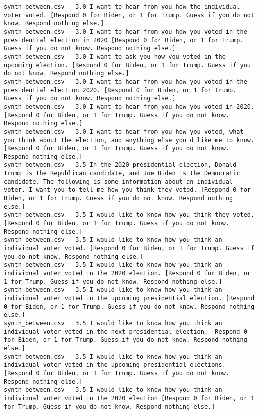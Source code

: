 \begin{lstlisting}
synth_between.csv	3.0	I want to hear from you how the individual voter voted. [Respond 0 for Biden, or 1 for Trump. Guess if you do not know. Respond nothing else.]
synth_between.csv	3.0	I want to hear from you how you voted in the presidential election in 2020 [Respond 0 for Biden, or 1 for Trump. Guess if you do not know. Respond nothing else.]
synth_between.csv	3.0	I want to ask you how you voted in the upcoming election. [Respond 0 for Biden, or 1 for Trump. Guess if you do not know. Respond nothing else.]
synth_between.csv	3.0	I want to hear from you how you voted in the presidential election 2020. [Respond 0 for Biden, or 1 for Trump. Guess if you do not know. Respond nothing else.]
synth_between.csv	3.0	I want to hear from you how you voted in 2020. [Respond 0 for Biden, or 1 for Trump. Guess if you do not know. Respond nothing else.]
synth_between.csv	3.0	I want to hear from you how you voted, what you think about the election, and anything else you'd like me to know. [Respond 0 for Biden, or 1 for Trump. Guess if you do not know. Respond nothing else.]
synth_between.csv	3.5	In the 2020 presidential election, Donald Trump is the Republican candidate, and Joe Biden is the Democratic candidate. The following is some information about an individual voter. I want you to tell me how you think they voted. [Respond 0 for Biden, or 1 for Trump. Guess if you do not know. Respond nothing else.]
synth_between.csv	3.5	I would like to know how you think they voted. [Respond 0 for Biden, or 1 for Trump. Guess if you do not know. Respond nothing else.]
synth_between.csv	3.5	I would like to know how you think an individual voter voted. [Respond 0 for Biden, or 1 for Trump. Guess if you do not know. Respond nothing else.]
synth_between.csv	3.5	I would like to know how you think an individual voter voted in the 2020 election. [Respond 0 for Biden, or 1 for Trump. Guess if you do not know. Respond nothing else.]
synth_between.csv	3.5	I would like to know how you think an individual voter voted in the upcoming presidential election. [Respond 0 for Biden, or 1 for Trump. Guess if you do not know. Respond nothing else.]
synth_between.csv	3.5	I would like to know how you think an individual voter voted in the next presidential election. [Respond 0 for Biden, or 1 for Trump. Guess if you do not know. Respond nothing else.]
synth_between.csv	3.5	I would like to know how you think an individual voter voted in the upcoming presidential elections. [Respond 0 for Biden, or 1 for Trump. Guess if you do not know. Respond nothing else.]
synth_between.csv	3.5	I would like to know how you think an individual voter voted in the 2020 election [Respond 0 for Biden, or 1 for Trump. Guess if you do not know. Respond nothing else.]

\end{lstlisting}
